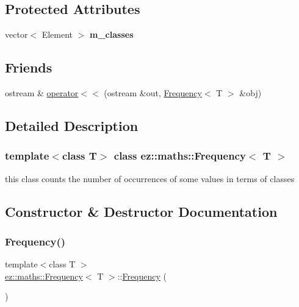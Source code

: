 \subsection*{Protected Attributes}
\begin{DoxyCompactItemize}
\item 
\mbox{\label{classez_1_1maths_1_1Frequency_a0b35037580b2a5c38012f53f95f01500}} 
vector$<$ Element $>$ {\bfseries m\+\_\+classes}
\end{DoxyCompactItemize}
\subsection*{Friends}
\begin{DoxyCompactItemize}
\item 
ostream \& \hyperlink{classez_1_1maths_1_1Frequency_a0909af66272f86930b70857efb6c6a7e}{operator$<$$<$} (ostream \&out, \hyperlink{classez_1_1maths_1_1Frequency}{Frequency}$<$ T $>$ \&obj)
\end{DoxyCompactItemize}


\subsection{Detailed Description}
\subsubsection*{template$<$class T$>$\newline
class ez\+::maths\+::\+Frequency$<$ T $>$}

this class counts the number of occurrences of some values in terms of classes 

\subsection{Constructor \& Destructor Documentation}
\mbox{\label{classez_1_1maths_1_1Frequency_aa090ee7e4117d4f5a694de71c44ec789}} 
\subsubsection{\texorpdfstring{Frequency()}{Frequency()}\hspace{0.1cm}{\footnotesize\ttfamily [1/2]}}
{\footnotesize\ttfamily template$<$class T $>$ \\
\hyperlink{classez_1_1maths_1_1Frequency}{ez\+::maths\+::\+Frequency}$<$ T $>$\+::\hyperlink{classez_1_1maths_1_1Frequency}{Frequency} (\begin{DoxyParamCaption}{ }\end{DoxyParamCaption})\hspace{0.3cm}{\ttfamily [inline]}}

